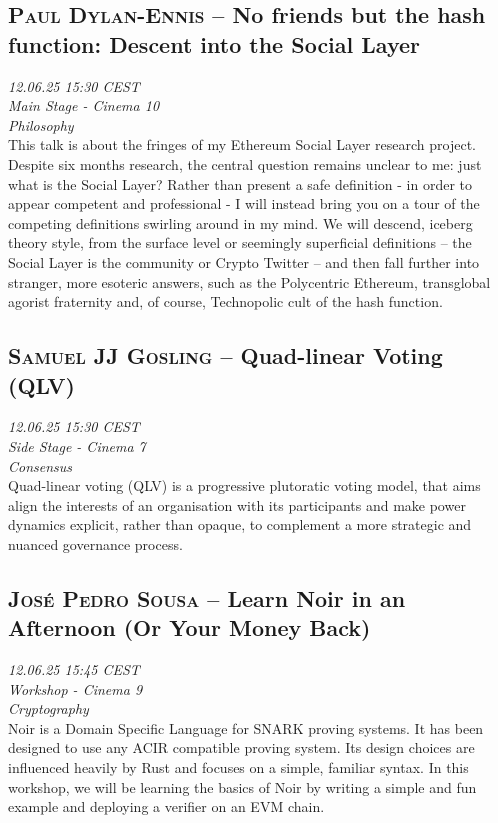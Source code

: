 \clearpage
\subsection {\textsc{Paul Dylan-Ennis}  -- No friends but the hash function: Descent into the Social Layer} \noindent \textit {12.06.25 15:30 CEST\\ Main Stage - Cinema 10\\ Philosophy}\\[1em] This talk is about the fringes of my Ethereum Social Layer research project. Despite six months research, the central question remains unclear to me: just what is the Social Layer? Rather than present a safe definition - in order to appear competent and professional - I will instead bring you on a tour of the competing definitions swirling around in my mind. We will descend, iceberg theory style, from the surface level or seemingly superficial definitions – the Social Layer is the community or Crypto Twitter – and then fall further into stranger, more esoteric answers, such as the Polycentric Ethereum, transglobal agorist fraternity and, of course, Technopolic cult of the hash function.

\clearpage
\subsection {\textsc{Samuel JJ Gosling}  -- Quad-linear Voting (QLV)} \noindent \textit {12.06.25 15:30 CEST\\ Side Stage - Cinema 7\\ Consensus}\\[1em] Quad-linear voting (QLV) is a progressive plutoratic voting model, that aims align the interests of an organisation with its participants and make power dynamics explicit, rather than opaque, to complement a more strategic and nuanced governance process.

\clearpage
\subsection {\textsc{José Pedro Sousa}  -- Learn Noir in an Afternoon (Or Your Money Back)} \noindent \textit {12.06.25 15:45 CEST\\ Workshop - Cinema 9\\ Cryptography}\\[1em] Noir is a Domain Specific Language for SNARK proving systems. It has been designed to use any ACIR compatible proving system. Its design choices are influenced heavily by Rust and focuses on a simple, familiar syntax. In this workshop, we will be learning the basics of Noir by writing a simple and fun example and deploying a verifier on an EVM chain.


